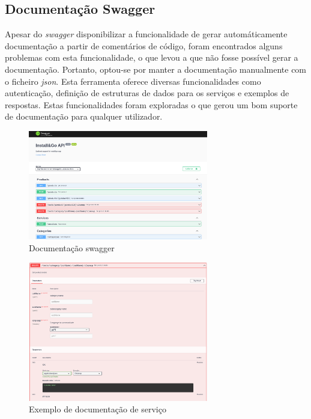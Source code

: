 \newpage

\subsection{Documentação Swagger}
Apesar do \textit{swagger} disponibilizar a funcionalidade de gerar automáticamente documentação a partir de comentários de código, foram encontrados alguns problemas com esta funcionalidade, o que levou a que não fosse possível gerar a documentação. Portanto, optou-se por manter a documentação manualmente com o ficheiro \textit{\acrshort{json}}. Esta ferramenta oferece diversas funcionalidades como autenticação, definição de estruturas de dados para os serviços e exemplos de respostas. Estas funcionalidades foram exploradas o que gerou um bom suporte de documentação para qualquer utilizador.

\begin{figure}[htb]
 \centering
 \includegraphics[width=0.7\textwidth]{images/implementacao/api/swagger_intro.png}
 \caption{Documentação swagger}
 \label{fig:67}
\end{figure}

\begin{figure}[htb]
 \centering
 \includegraphics[width=0.7\textwidth]{images/implementacao/api/swagger_pedido.png}
 \caption{Exemplo de documentação de serviço}
 \label{fig:68}
\end{figure}